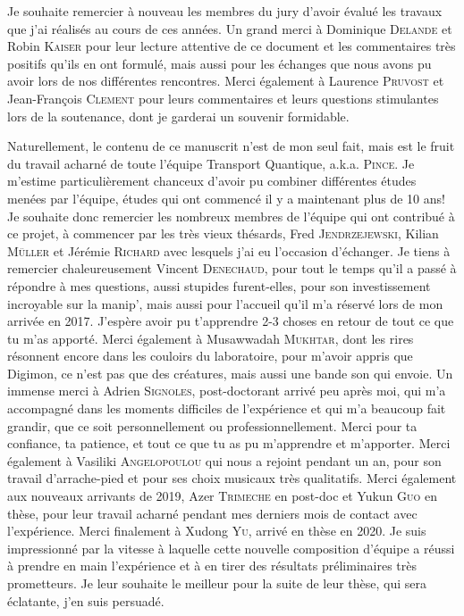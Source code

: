 Je souhaite remercier à nouveau les membres du jury d'avoir évalué les travaux que j'ai réalisés au cours de ces années. Un grand merci à Dominique \textsc{Delande} et Robin \textsc{Kaiser} pour leur lecture attentive de ce document et les commentaires très positifs qu'ils en ont formulé, mais aussi pour les échanges que nous avons pu avoir lors de nos différentes rencontres. Merci également à Laurence \textsc{Pruvost} et Jean-François \textsc{Clement} pour leurs commentaires et leurs questions stimulantes lors de la soutenance, dont je garderai un souvenir formidable. 

Naturellement, le contenu de ce manuscrit n'est de mon seul fait, mais est le fruit du travail acharné de toute l'équipe Transport Quantique, a.k.a. \textsc{Pince}. Je m'estime particulièrement chanceux d'avoir pu combiner différentes études menées par l'équipe, études qui ont commencé il y a maintenant plus de 10 ans! Je souhaite donc remercier les nombreux membres de l'équipe qui ont contribué à ce projet, à commencer par les très vieux thésards, Fred \textsc{Jendrzejewski}, Kilian \textsc{Müller} et Jérémie \textsc{Richard} avec lesquels j'ai eu l'occasion d'échanger. Je tiens à remercier chaleureusement Vincent \textsc{Denechaud}, pour tout le temps qu'il a passé à répondre à mes questions, aussi stupides furent-elles, pour son investissement incroyable sur la manip', mais aussi pour l'accueil qu'il m'a réservé lors de mon arrivée en 2017. J'espère avoir pu t'apprendre 2-3 choses en retour de tout ce que tu m'as apporté. Merci également à Musawwadah \textsc{Mukhtar}, dont les rires résonnent encore dans les couloirs du laboratoire, pour m'avoir appris que Digimon, ce n'est pas que des créatures, mais aussi une bande son qui envoie. Un immense merci à Adrien \textsc{Signoles}, post-doctorant arrivé peu après moi, qui m'a accompagné dans les moments difficiles de l'expérience et qui m'a beaucoup fait grandir, que ce soit personnellement ou professionnellement. Merci pour ta confiance, ta patience, et tout ce que tu as pu m'apprendre et m'apporter. Merci également à Vasiliki \textsc{Angelopoulou} qui nous a rejoint pendant un an, pour son travail d'arrache-pied et pour ses choix musicaux très qualitatifs. Merci également aux nouveaux arrivants de 2019, Azer \textsc{Trimeche} en post-doc et Yukun \textsc{Guo} en thèse, pour leur travail acharné pendant mes derniers mois de contact avec l'expérience. Merci finalement à Xudong \textsc{Yu}, arrivé en thèse en 2020. Je suis impressionné par la vitesse à laquelle cette nouvelle composition d'équipe a réussi à prendre en main l'expérience et à en tirer des résultats préliminaires très prometteurs. Je leur souhaite le meilleur pour la suite de leur thèse, qui sera éclatante, j'en suis persuadé.

